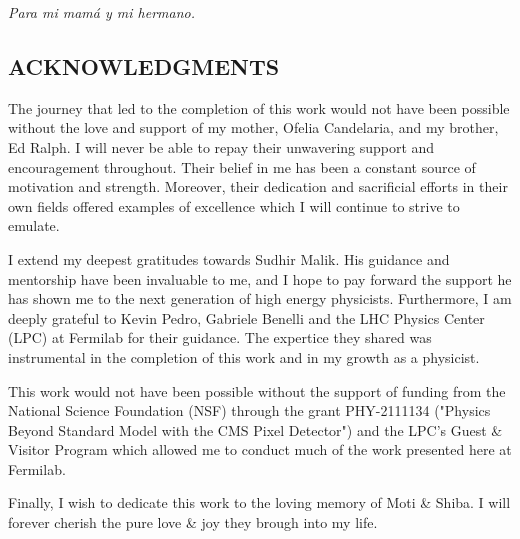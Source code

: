 


\vspace*{2in}
\begin{center}
	\emph{Para mi mamá y mi hermano.}
\end{center}

\newpage


\vspace*{0.5in}
\begin{center}
	\section*{ACKNOWLEDGMENTS}
\end{center}



\noindent The journey that led to the completion of this work would not have been possible without the love and support of my mother, Ofelia Candelaria, and my brother, Ed Ralph. I will never be able to repay their unwavering support and encouragement throughout. Their belief in me has been a constant source of motivation and strength. Moreover, their dedication and sacrificial efforts in their own fields offered examples of excellence which I will continue to strive to emulate.

I extend my deepest gratitudes towards Sudhir Malik. His guidance and mentorship have been invaluable to me, and I hope to pay forward the support he has shown me to the next generation of high energy physicists. Furthermore, I am deeply grateful to Kevin Pedro, Gabriele Benelli and the LHC Physics Center (LPC) at Fermilab for their guidance. The expertice they shared was instrumental in the completion of this work and in my growth as a physicist.

This work would not have been possible without the support of funding from the National Science Foundation (NSF) through the grant PHY-2111134 ("Physics Beyond Standard Model with the CMS Pixel Detector") and the LPC's Guest \& Visitor Program which allowed me to conduct much of the work presented here at Fermilab.

Finally, I wish to dedicate this work to the loving memory of Moti \& Shiba. I will forever cherish the pure love \& joy they brough into my life.

